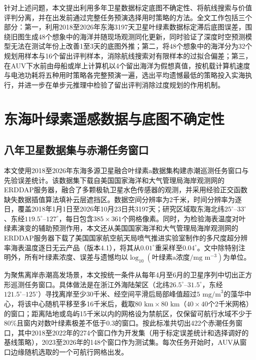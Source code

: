 针对上述问题，本文提出利用多年卫星数据标定底图不确定性、将航线搜索与价值评判分离，并在出发前通过完整任务预演选择用时策略的方法。全文工作包括三个部分：第一，利用2018至2026年东海3197天卫星叶绿素数据标定滞后底图误差，围绕旧图生成48个想象中的海洋并随现场观测同化更新，同时验证了深度时空预测模型无法在测试年份上改善1至3天的底图外推；第二，将48个想象中的海洋分为32个规划用样本与16个留出评判样本，消除航线搜索对有限样本的过拟合偏差；第三，在AUV下水前由母船或岸上计算机以4个留出海洋为假想真值，按机载计算机速度与电池功耗将五种用时策略各完整预演一遍，选出平均遗憾最低的策略投入实海执行，并进一步在单步元推理中检验了留出评判消除过度规划的作用机制。

\section{东海叶绿素遥感数据与底图不确定性}

\subsection{八年卫星数据集与赤潮任务窗口}

本文使用2018至2026年东海多源卫星融合叶绿素a数据集构建赤潮巡测任务窗口与先验误差统计。该数据集下载自美国国家海洋和大气管理局海岸观测网的ERDDAP服务器，融合了多颗极轨卫星水色传感器的观测，并采用经验正交函数缺失数据插值算法填补云层遮挡区\cite{beckers2003dineof}。数据空间分辨率为2千米，时间分辨率为逐日，覆盖2018年1月1日至2026年10月23日共3197天；研究区域取东海北纬$25^\circ\text{--}33^\circ$、东经$119.5^\circ\text{--}127^\circ$，每日包含$385\times 361$个网格像素。同时，为检验海表温度对叶绿素演变的辅助预测作用，本文还从美国国家海洋和大气管理局海岸观测网的ERDDAP服务器下载了美国国家航空航天局喷气推进实验室制作的多尺度超分辨率海表温度逐日无云产品（版本4.1）\cite{chin2017mur}，将其从$0.01^\circ$重采样至$0.04^\circ$。文中除特别注明外，所有叶绿素浓度、误差与遗憾均以$\log_{10}(\text{叶绿素a浓度}/\text{mg m}^{-3})$为单位。

为聚焦离岸赤潮高发场景，本文按统一条件从每年4月至6月的卫星序列中切出正方形巡测任务窗口。具体做法是在浙江外海陆架区（北纬$26.5^\circ\text{--}31.5^\circ$，东经$121.5^\circ\text{--}125^\circ$）寻找离岸至少30千米、经空间平滑后局部峰值超过$5\text{ mg/m}^3$的藻华中心，将该中心随机平移至多16千米后，截取$80\text{ km}\times 80\text{ km}$（$40\times 40$个2千米网格）的窗口；距离陆地或岛屿15千米以内的网格设为禁航区，仅保留可航行水域不少于80\%且窗内对数叶绿素极差不低于0.3的窗口。按此标准共切出422个赤潮任务窗口，其中2018至2022年的274个窗口作为开发集（用于标定误差统计和选择调好的基线策略），2023至2026年的148个窗口作为测试集。每次任务开始时，AUV从窗口边缘随机选取的一个可航行网格出发。

